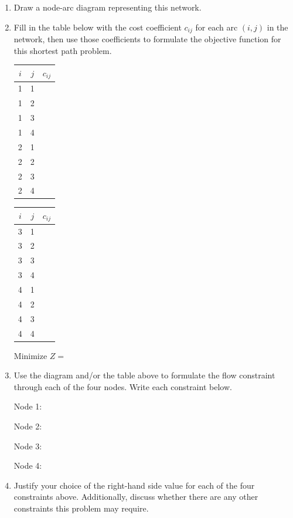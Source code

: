 \documentclass[11pt]{article}
\begin{document}
\begin{enumerate}[label=(\alph*)]
\item Draw a node-arc diagram representing this network.

\vfill

\item Fill in the table below with the cost coefficient $c_{ij}$ for each arc $(i,j)$ in the network, then use those coefficients to formulate the objective function for this shortest path problem.

\begin{center}
\begin{minipage}{0.45\textwidth}
\centering
\begin{tabular}{|c|c|c|}
\hline
$i$ & $j$ & $c_{ij}$ \\
\hline
1 & 1 & \\
\hline
1 & 2 & \\
\hline
1 & 3 & \\
\hline
1 & 4 & \\
\hline
2 & 1 & \\
\hline
2 & 2 & \\
\hline
2 & 3 & \\
\hline
2 & 4 & \\
\hline
\end{tabular}
\end{minipage}%
\hfill
\begin{minipage}{0.45\textwidth}
\centering
\begin{tabular}{|c|c|c|}
\hline
$i$ & $j$ & $c_{ij}$ \\
\hline
3 & 1 & \\
\hline
3 & 2 & \\
\hline
3 & 3 & \\
\hline
3 & 4 & \\
\hline
4 & 1 & \\
\hline
4 & 2 & \\
\hline
4 & 3 & \\
\hline
4 & 4 & \\
\hline
\end{tabular}
\end{minipage}
\end{center}

\vspace{0.2in}
\noindent Minimize $Z = $

\newpage

\item Use the diagram and/or the table above to formulate the flow constraint through each of the four nodes. Write each constraint below.

\noindent Node 1:
\vfill

\noindent Node 2:
\vfill

\noindent Node 3:
\vfill

\noindent Node 4:
\vfill

\item Justify your choice of the right-hand side value for each of the four constraints above. Additionally, discuss whether there are any other constraints this problem may require.
\vfill
\vfill
\vfill

\end{enumerate}
\end{document}

